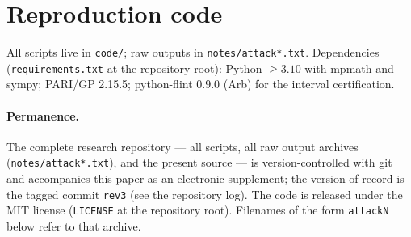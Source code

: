 \documentclass[11pt]{amsart}
\theoremstyle{definition}
\theoremstyle{remark}
\begin{document}
\section{Reproduction code}
\label{app:code}

All scripts live in \texttt{code/}; raw outputs in
\texttt{notes/attack*.txt}. Dependencies (\texttt{requirements.txt} at the
repository root): Python $\ge3.10$ with mpmath and
sympy; PARI/GP 2.15.5; python-flint 0.9.0 (Arb) for the interval certification.

\paragraph{Permanence.}
The complete research repository --- all scripts, all raw output archives
(\texttt{notes/attack*.txt}), and the present source --- is version-controlled
with git and accompanies this paper as an electronic supplement; the version
of record is the tagged commit \texttt{rev3} (see the repository log). The
code is released under the MIT license (\texttt{LICENSE} at the repository
root). Filenames of the form
\texttt{attackN} below refer to that archive.
\end{document}

